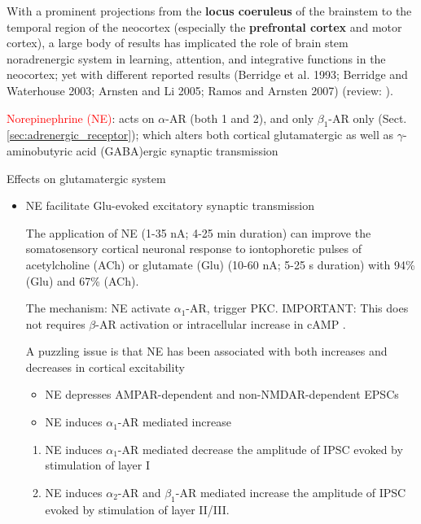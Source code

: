 With a prominent projections from the {\bf locus coeruleus} of the brainstem to
the temporal region of the neocortex (especially the {\bf prefrontal cortex} and
motor cortex), a large body of results has implicated the role of brain stem
noradrenergic system in learning, attention, and integrative functions in the
neocortex; yet with different reported results (Berridge et al. 1993; Berridge
and Waterhouse 2003; Arnsten and Li 2005; Ramos and Arnsten 2007) (review:
\citep{salgado2009}).


\textcolor{red}{Norepinephrine (NE)}: acts on $\alpha$-AR (both 1 and 2), and
only $\beta_1$-AR only (Sect.\ref{sec:adrenergic_receptor}); which alters both
cortical glutamatergic as well as $\gamma$-aminobutyric acid (GABA)ergic
synaptic transmission

Effects on glutamatergic system
\begin{itemize}
  \item NE facilitate Glu-evoked excitatory synaptic transmission
 
 The application of NE (1-35 nA; 4-25 min duration) can improve the
 somatosensory cortical neuronal response to iontophoretic pulses of
 acetylcholine (ACh) or glutamate (Glu) (10-60 nA; 5-25 s duration) with 94\%
 (Glu) and 67\% (ACh).
  
 The mechanism: NE activate $\alpha_1$-AR, trigger PKC.
 IMPORTANT: This does not requires $\beta$-AR activation or intracellular
 increase in cAMP \citep{mouradian1991}.
 
  
A puzzling issue is that NE has been associated with both
increases and decreases in cortical excitability
\begin{itemize}
  \item NE depresses AMPAR-dependent and non-NMDAR-dependent 
  EPSCs 
  
  \item NE induces $\alpha_1$-AR mediated increase  
\end{itemize}

\begin{enumerate}
  \item NE induces $\alpha_1$-AR mediated decrease 
  the amplitude of IPSC evoked by stimulation of layer I
  
  \item NE induces $\alpha_2$-AR and $\beta_1$-AR mediated increase
  the amplitude of IPSC evoked by stimulation of layer II/III.
  
\end{enumerate}
\end{itemize}

